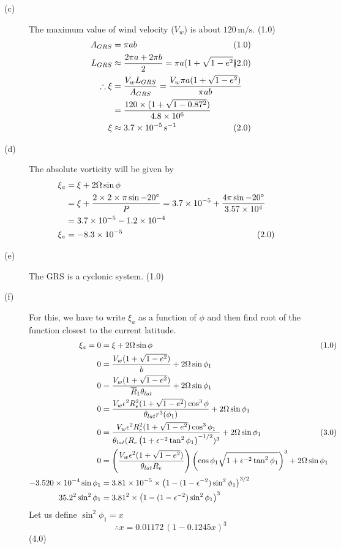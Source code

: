 \begin{description}
\item[(c)] The maximum value of wind velocity ($V_w$) is about $120\,\mathrm{m/s}$. \hfill(1.0)
\begin{align*}
A_{GRS} &= \pi a b & &\hspace{-2em}(1.0)\\
L_{GRS} &\approx \frac{2\pi a + 2\pi b}{2} = \pi a(1 + \sqrt{1 - e^2}) & &\hspace{-2em}(2.0)\\
\therefore \xi &= \frac{V_w L_{GRS}}{A_{GRS}} = \frac{V_w\pi a(1 + \sqrt{1 - e^2})}{\pi a b}\\
 &= \frac{120\times(1 + \sqrt{1 - 0.87^2})}{4.8\times10^6}\\
\xi &\approx 3.7\times10^{-5}\,\mathrm{s}^{-1} & &\hspace{-2em}(2.0)
\end{align*}

\item[(d)] The absolute vorticity will be given by
\begin{align*}
\xi_a &= \xi + 2\Omega\sin\phi\\
 &= \xi + \frac{2\times2\times\pi\sin-20^\circ}{P}
   = 3.7\times10^{-5} + \frac{4\pi\sin-20^\circ}{3.57\times10^4}\\
 &= 3.7\times10^{-5} - 1.2\times10^{-4}\\
\xi_a &= -8.3\times10^{-5} & &\hspace{-2em}(2.0)
\end{align*}

\item[(e)] The GRS is a cyclonic system. \hfill(1.0)

\item[(f)] For this, we have to write $\xi_a$ as a function of $\phi$ and then find root of the
function closest to the current latitude.
\begin{align*}
\xi_a = 0 &= \xi + 2\Omega\sin\phi & &\hspace{-2em}(1.0)\\
0 &= \frac{V_w(1 + \sqrt{1 - e^2})}{b} + 2\Omega\sin\phi_1\\
0 &= \frac{V_w(1 + \sqrt{1 - e^2})}{\overline{R}_1\theta_{lat}} + 2\Omega\sin\phi_1\\
0 &= \frac{V_w\epsilon^2 R_e^2(1 + \sqrt{1 - e^2})\cos^3\phi}{\theta_{lat}r^3(\phi_1)}
   + 2\Omega\sin\phi_1\\
0 &= \frac{V_w\epsilon^2 R_e^2(1 + \sqrt{1 - e^2})\cos^3\phi_1}
   {\theta_{lat}(R_e\left(1 + \epsilon^{-2}\tan^2\phi_1\right)^{-1/2})^3}
   + 2\Omega\sin\phi_1 & &\hspace{-2em}(3.0)\\
0 &= \left(\frac{V_w\epsilon^2(1 + \sqrt{1 - e^2})}{\theta_{lat}R_e}\right)
   \left(\cos\phi_1\sqrt{1 + \epsilon^{-2}\tan^2\phi_1}\right)^3 + 2\Omega\sin\phi_1\\
-3.520\times10^{-4}\sin\phi_1 &= 3.81\times10^{-5}\times
   \left(1 - (1 - \epsilon^{-2})\sin^2\phi_1\right)^{3/2}\\
35.2^2\sin^2\phi_1 &= 3.81^2\times\left(1 - (1 - \epsilon^{-2})\sin^2\phi_1\right)^3
\end{align*}
Let us define $\sin^2\phi_1 = x$
\[
\therefore x = 0.01172\,(1 - 0.1245x)^3
\]
\hfill(4.0)


\end{description}
